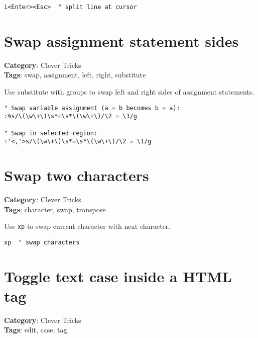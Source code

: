 {{{\begin{Exa*}{}
\begin{Verbatim}[fontsize=\footnotesize, breaklines, breakanywhere]
i<Enter><Esc>  " split line at cursor
\end{Verbatim}
\end{Exa*}

\section{Swap assignment statement sides}

\textbf{Category}: Clever Tricks\\ \textbf{Tags}: swap, assignment, left, right, substitute
\vspace{0.5cm}

Use substitute with groups to swap left and right sides of assignment statements.

\begin{Exa*}{}
\begin{Verbatim}[fontsize=\footnotesize, breaklines, breakanywhere]
" Swap variable assignment (a = b becomes b = a):
:%s/\(\w\+\)\s*=\s*\(\w\+\)/\2 = \1/g

" Swap in selected region:
:'<,'>s/\(\w\+\)\s*=\s*\(\w\+\)/\2 = \1/g
\end{Verbatim}
\end{Exa*}

\section{Swap two characters}

\textbf{Category}: Clever Tricks\\ \textbf{Tags}: character, swap, transpose
\vspace{0.5cm}

Use {\footnotesize \Verb§xp§} to swap current character with next character.

\begin{Exa*}{}
\begin{Verbatim}[fontsize=\footnotesize, breaklines, breakanywhere]
xp  " swap characters
\end{Verbatim}
\end{Exa*}

\section{Toggle text case inside a HTML tag}

\textbf{Category}: Clever Tricks\\ \textbf{Tags}: edit, case, tag
\vspace{0.5cm}

}}}
